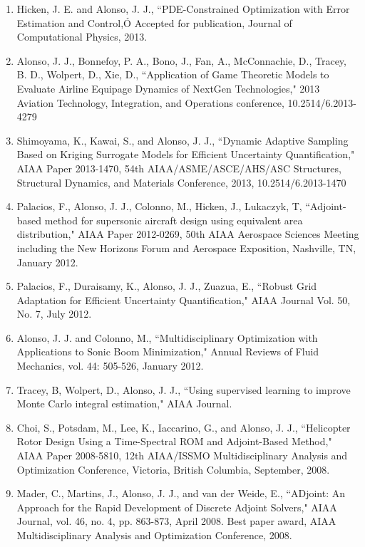 \begin{enumerate}

\item Hicken, J. E. and Alonso, J. J., ``PDE-Constrained Optimization with Error Estimation and Control,Ó Accepted for publication, Journal of Computational Physics, 2013.

\item Alonso, J. J., Bonnefoy, P. A., Bono, J., Fan, A., McConnachie, D., Tracey, B. D., Wolpert, D., Xie, D., ``Application of Game Theoretic Models to Evaluate Airline Equipage Dynamics of NextGen Technologies," 2013 Aviation Technology, Integration, and Operations conference, 10.2514/6.2013-4279

\item Shimoyama, K., Kawai, S., and Alonso, J. J., ``Dynamic Adaptive Sampling Based on Kriging Surrogate Models for Efficient Uncertainty Quantification," AIAA Paper 2013-1470, 54th AIAA/ASME/ASCE/AHS/ASC Structures, Structural Dynamics, and Materials Conference, 2013, 10.2514/6.2013-1470

\item Palacios, F., Alonso, J. J., Colonno, M., Hicken, J., Lukaczyk, T, ``Adjoint-based method for supersonic aircraft design using equivalent area distribution," AIAA Paper 2012-0269, 50th AIAA Aerospace Sciences Meeting including the New Horizons Forum and Aerospace Exposition, Nashville, TN, January 2012.

\item Palacios, F., Duraisamy, K., Alonso, J. J., Zuazua, E., ``Robust Grid Adaptation for Efficient Uncertainty Quantification," AIAA Journal Vol. 50, No. 7, July 2012.

\item Alonso, J. J. and Colonno, M., ``Multidisciplinary Optimization with Applications to Sonic Boom Minimization," Annual Reviews of Fluid Mechanics, vol. 44: 505-526, January 2012.

\item Tracey, B, Wolpert, D., Alonso, J. J., ``Using supervised learning to improve Monte Carlo integral estimation," AIAA Journal.

\item Choi, S., Potsdam, M., Lee, K., Iaccarino, G., and Alonso, J. J., ``Helicopter Rotor Design Using a Time-Spectral ROM and Adjoint-Based Method," AIAA Paper 2008-5810, 12th AIAA/ISSMO Multidisciplinary Analysis and Optimization Conference, Victoria, British Columbia, September, 2008.

\item Mader, C., Martins, J., Alonso, J. J., and van der Weide, E., ``ADjoint: An Approach for the Rapid Development of Discrete Adjoint Solvers," AIAA Journal, vol. 46, no. 4, pp. 863-873, April 2008.  Best paper award, AIAA Multidisciplinary Analysis and Optimization Conference, 2008.


\end{enumerate}
